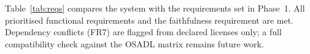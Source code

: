 Table~\ref{tab:reqs} compares the system with the requirements set in Phase~1. All prioritised functional requirements and the faithfulness requirement are met. Dependency conflicts (FR7) are flagged from declared licenses only; a full compatibility check against the OSADL matrix remains future work.
